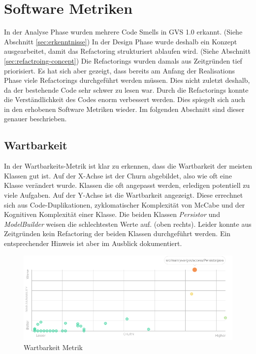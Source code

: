 \documentclass[11pt,a4paper,english,oneside]{book}
\numberwithin{equation}{chapter}
\begin{document}
	\section{Software Metriken} \label{sec:metrics-2}
	In der Analyse Phase wurden mehrere Code Smells in GVS 1.0 erkannt. (Siehe Abschnitt \ref{sec:erkenntnisse}) In der Design Phase wurde deshalb ein Konzept ausgearbeitet, damit das Refactoring strukturiert ablaufen wird. (Siehe Abschnitt \ref{sec:refactroing-concept}) Die Refactorings wurden damals aus Zeitgründen tief priorisiert. Es hat sich aber gezeigt, dass bereits am Anfang der Realisations Phase viele Refactorings durchgeführt werden müssen. Dies nicht zuletzt deshalb, da der bestehende Code sehr schwer zu lesen war. Durch die Refactorings konnte die Verständlichkeit des Codes enorm verbessert werden. Dies spiegelt sich auch in den erhobenen Software Metriken wieder. Im folgenden Abschnitt sind dieser genauer beschrieben.
	
	\subsection{Wartbarkeit}
	In der Wartbarkeits-Metrik \cite{metric-maintainability} ist klar zu erkennen, dass die Wartbarkeit der meisten Klassen gut ist. Auf der X-Achse ist der Churn \cite{metric-churn} abgebildet, also wie oft eine Klasse verändert wurde. Klassen die oft angepasst werden, erledigen potentiell zu viele Aufgaben. Auf der Y-Achse ist die Wartbarkeit angezeigt. Diese errechnet sich aus Code-Duplikationen, zyklomatischer Komplexität von McCabe \cite{mccabe} und der Kognitiven Komplexität \cite{metric-cognitive-complexity} einer Klasse. Die beiden Klassen \textit{Persistor} und \textit{ModelBuilder} weisen die schlechtesten Werte auf. (oben rechts). Leider konnte aus Zeitgründen kein Refactoring der beiden Klassen durchgeführt werden. Ein entsprechender Hinweis ist aber im Ausblick dokumentiert.
	\begin{figure}[h!]
		\centering
		\includegraphics[width=0.7\linewidth]{assets/images/metrics/maintainability}
		\caption{Wartbarkeit Metrik}
		\label{fig:metric-maintainability}
	\end{figure}
	
\end{document}
